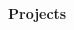 \noindent\textbf{Projects}
\noindent\hrulefill
\vspace{0.25em}
\begin{adjustwidth}{1.5em}{0em}
\end{adjustwidth}
\vspace{0.25em}